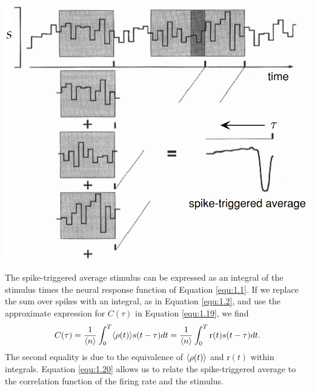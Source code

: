 \begin{center}
  \includegraphics[scale=0.46]{./png/computation-spiTriAvST.png}
  \label{fig:1.8}  
\end{center}

\begin{prop}
  \label{prop:integral-STAS}
  The spike-triggered average stimulus can be expressed as an integral of the stimulus times the neural response function of Equation \ref{equ:1.1}. If we replace the sum over spikes with an integral, as in Equation \ref{equ:1.2}, and use the approximate expression for $C(\tau)$ in Equation \ref{equ:1.19}, we find
  \begin{equation}
    \label{equ:1.20}
    C(\tau) = \frac{1}{\langle n \rangle} \int_0^T \langle \rho(t) \rangle s(t-\tau) dt = \frac{1}{\langle n \rangle} \int_0^T \text{r}(t) s(t-\tau) dt.
  \end{equation}
  The second equality is due to the equivalence of $\langle \rho(t) \rangle$ and $\text{r}(t)$ within integrals. Equation \ref{equ:1.20} allows us to relate the spike-triggered average to the correlation function of the firing rate and the stimulus.
\end{prop}

